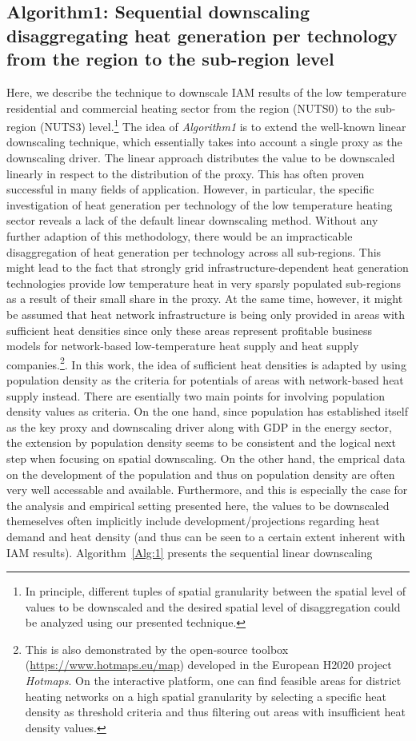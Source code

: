 \subsection{Algorithm1: Sequential downscaling disaggregating heat generation per technology from the region to the sub-region level}
Here, we describe the technique to downscale IAM results of the low temperature residential and commercial heating sector from the region (NUTS0) to the sub-region (NUTS3) level.\footnote{In principle, different tuples of spatial granularity between the spatial level of values to be downscaled and the desired spatial level of disaggregation could be analyzed using our presented technique.} The idea of \textit{Algorithm1} is to extend the well-known linear downscaling technique, which essentially takes into account a single proxy as the downscaling driver. The linear approach distributes the value to be downscaled linearly in respect to the distribution of the proxy. This has often proven successful in many fields of application. However, in particular, the specific investigation of heat generation per technology of the low temperature heating sector reveals a lack of the default linear downscaling method. Without any further adaption of this methodology, there would be an impracticable disaggregation of heat generation per technology across all sub-regions. This might lead to the fact that strongly grid infrastructure-dependent heat generation technologies provide low temperature heat in very sparsly populated sub-regions as a result of their small share in the proxy. At the same time, however, it might be assumed that heat network infrastructure is being only provided in areas with sufficient heat densities since only these areas represent profitable business models for network-based low-temperature heat supply and heat supply companies.\footnote{This is also demonstrated by the open-source toolbox (\url{https://www.hotmaps.eu/map}) developed in the European H2020 project \textit{Hotmaps}. On the interactive platform, one can find feasible areas for district heating networks on a high spatial granularity by selecting a specific heat density as threshold criteria and thus filtering out areas with insufficient heat density values.}. In this work, the idea of sufficient heat densities is adapted by using population density as the criteria for potentials of areas with network-based heat supply instead. There are esentially two main points for involving population density values as criteria. On the one hand, since population has established itself as the key proxy and downscaling driver along with GDP in the energy sector, the extension by population density seems to be consistent and the logical next step when focusing on spatial downscaling. On the other hand, the emprical data on the development of the population and thus on population density are often very well accessable and available. Furthermore, and this is especially the case for the analysis and empirical setting presented here, the values to be downscaled themeselves often implicitly include development/projections regarding heat demand and heat density (and thus can be seen to a certain extent inherent with IAM results). Algorithm~\ref{Alg:1} presents the sequential linear downscaling 